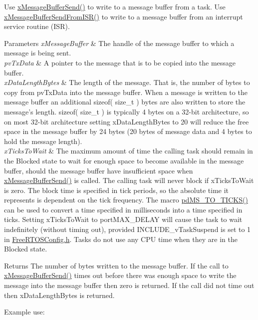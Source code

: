 \begin{DoxyPre}
\begin{DoxyPre}   Use \hyperlink{message__buffer_8h_a858f6da6fe24a226c45caf1634ea1605}{xMessageBufferSend()} to write to a message buffer from a task.  Use
   \hyperlink{message__buffer_8h_aeef5b0c4f8c2db6ca2230a8874813e79}{xMessageBufferSendFromISR()} to write to a message buffer from an interrupt
   service routine (ISR).\end{DoxyPre}
\end{DoxyPre}



\begin{DoxyPre}
\begin{DoxyPre}   
\begin{DoxyParams}{Parameters}
{\em xMessageBuffer} & The handle of the message buffer to which a message is
   being sent.\\
\hline
{\em pvTxData} & A pointer to the message that is to be copied into the
   message buffer.\\
\hline
{\em xDataLengthBytes} & The length of the message.  That is, the number of
   bytes to copy from pvTxData into the message buffer.  When a message is
   written to the message buffer an additional sizeof( size\_t ) bytes are also
   written to store the message's length.  sizeof( size\_t ) is typically 4 bytes
   on a 32-bit architecture, so on most 32-bit architecture setting
   xDataLengthBytes to 20 will reduce the free space in the message buffer by 24
   bytes (20 bytes of message data and 4 bytes to hold the message length).\\
\hline
{\em xTicksToWait} & The maximum amount of time the calling task should remain
   in the Blocked state to wait for enough space to become available in the
   message buffer, should the message buffer have insufficient space when
   \hyperlink{message__buffer_8h_a858f6da6fe24a226c45caf1634ea1605}{xMessageBufferSend()} is called.  The calling task will never block if
   xTicksToWait is zero.  The block time is specified in tick periods, so the
   absolute time it represents is dependent on the tick frequency.  The macro
   \hyperlink{projdefs_8h_a353d0f62b82a402cb3db63706c81ec3f}{pdMS\_TO\_TICKS()} can be used to convert a time specified in milliseconds into
   a time specified in ticks.  Setting xTicksToWait to portMAX\_DELAY will cause
   the task to wait indefinitely (without timing out), provided
   INCLUDE\_vTaskSuspend is set to 1 in \hyperlink{_free_r_t_o_s_config_8h}{FreeRTOSConfig.h}.  Tasks do not use any
   CPU time when they are in the Blocked state.\\
\hline
\end{DoxyParams}
\begin{DoxyReturn}{Returns}
The number of bytes written to the message buffer.  If the call to
   \hyperlink{message__buffer_8h_a858f6da6fe24a226c45caf1634ea1605}{xMessageBufferSend()} times out before there was enough space to write the
   message into the message buffer then zero is returned.  If the call did not
   time out then xDataLengthBytes is returned.
\end{DoxyReturn}
Example use:


\end{DoxyPre}
\end{DoxyPre}
